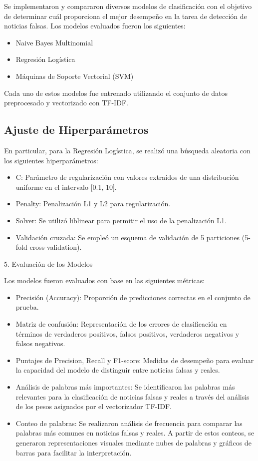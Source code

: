 \documentclass[journal]{IEEEtran}
\begin{document}
Se implementaron y compararon diversos modelos de clasificación con el objetivo de determinar cuál proporciona el mejor desempeño en la tarea de detección de noticias falsas. Los modelos evaluados fueron los siguientes:
\begin{itemize}
    \item Naive Bayes Multinomial
    \item Regresión Logística
    \item Máquinas de Soporte Vectorial (SVM)
\end{itemize}

Cada uno de estos modelos fue entrenado utilizando el conjunto de datos preprocesado y vectorizado con TF-IDF.

\subsection{Ajuste de Hiperparámetros}

En particular, para la Regresión Logística, se realizó una búsqueda aleatoria con los siguientes hiperparámetros:
\begin{itemize}
    \item C: Parámetro de regularización con valores extraídos de una distribución uniforme en el intervalo [0.1, 10].
    \item Penalty: Penalización L1 y L2 para regularización.
    \item Solver: Se utilizó liblinear para permitir el uso de la penalización L1.
    \item Validación cruzada: Se empleó un esquema de validación de 5 particiones (5-fold cross-validation).
\end{itemize}
5. Evaluación de los Modelos

Los modelos fueron evaluados con base en las siguientes métricas:
\begin{itemize}
    \item Precisión (Accuracy): Proporción de predicciones correctas en el conjunto de prueba.
    \item Matriz de confusión: Representación de los errores de clasificación en términos de verdaderos positivos, falsos positivos, verdaderos negativos y falsos negativos.
    \item Puntajes de Precision, Recall y F1-score: Medidas de desempeño para evaluar la capacidad del modelo de distinguir entre noticias falsas y reales.
    \item Análisis de palabras más importantes: Se identificaron las palabras más relevantes para la clasificación de noticias falsas y reales a través del análisis de los pesos asignados por el vectorizador TF-IDF.
    \item Conteo de palabras: Se realizaron análisis de frecuencia para comparar las palabras más comunes en noticias falsas y reales. A partir de estos conteos, se generaron representaciones visuales mediante nubes de palabras y gráficos de barras para facilitar la interpretación.
\end{itemize}
	
\end{document}
